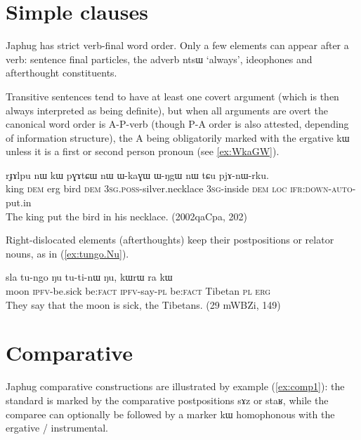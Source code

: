 \documentclass[oldfontcommands,oneside,a4paper,11pt]{article}
\newcommand{\ipa}[1]{{\phon#1}} %
\newcommand{\refb}[1]{(\ref{#1})}
\newcommand{\factual}[1]{\textsc{:fact}}
\begin{document}
\section{Simple clauses} 

Japhug has strict verb-final word order. Only a few elements can appear after a verb: sentence final particles, the adverb \ipa{ntsɯ} `always', ideophones and afterthought constituents.

Transitive sentences tend to have at least one covert argument (which is then always interpreted as being definite), but when all arguments are overt the canonical word order is A-P-verb (though P-A order is also attested, depending of information structure), the A being obligatorily marked with the ergative \ipa{kɯ} unless it is a first or second person pronoun (see \ref{ex:WkaGW}).

\begin{exe}
\ex \label{ex:WkaGW}
\gll
\ipa{rɟɤlpu} 	\ipa{nɯ} 	\ipa{kɯ} 	\ipa{pɣɤtɕɯ} 	\ipa{nɯ} 	\ipa{ɯ-kaɣɯ} 	\ipa{ɯ-ŋgɯ} 	\ipa{nɯ} 	\ipa{tɕu} 	\ipa{pjɤ-nɯ-rku.} \\
king \textsc{dem} erg bird \textsc{dem} \textsc{3sg.poss}-silver.necklace \textsc{3sg}-inside \textsc{dem} \textsc{loc} \textsc{ifr:down-auto}-put.in \\
\glt The king put the bird in his necklace. (2002qaCpa, 202)
\end{exe}

Right-dislocated elements (afterthoughts) keep their postpositions or relator nouns, as in \refb{ex:tungo.Nu}.

\begin{exe}
\ex \label{ex:tungo.Nu}
\gll
\ipa{sla} 	\ipa{tu-ngo} 	\ipa{ŋu} 	\ipa{tu-ti-nɯ} 	\ipa{ŋu,} 	\ipa{kɯrɯ} 	\ipa{ra} 	\ipa{kɯ} \\
moon \textsc{ipfv}-be.sick  be\factual{} \textsc{ipfv}-say-\textsc{pl}  be\factual{}  Tibetan \textsc{pl} \textsc{erg} \\
\glt They say that the moon is sick, the Tibetans. (29 mWBZi, 149)
\end{exe}

\section{Comparative}

Japhug comparative constructions are illustrated by example \refb{ex:comp1}: the standard is marked by the comparative postpositions \ipa{sɤz} or \ipa{staʁ}, while the comparee can optionally be followed by a marker \ipa{kɯ} homophonous with the ergative / instrumental.
\end{document}

